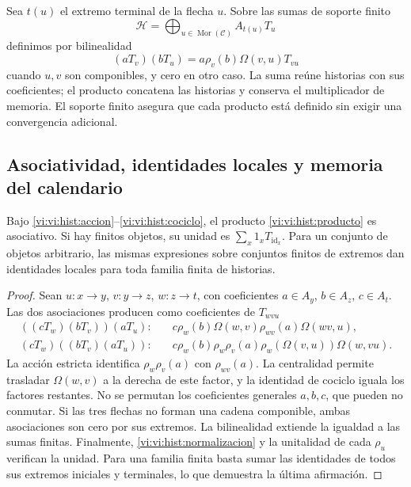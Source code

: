 Sea \(t(u)\) el extremo terminal de la flecha \(u\). Sobre las sumas
de soporte finito
\[
 \mathcal H=\bigoplus_{u\in\operatorname{Mor}(\mathcal C)}A_{t(u)}T_u
\]
definimos por bilinealidad
\begin{equation}
 (aT_v)(bT_u)=
 a\rho_v(b)\Omega(v,u)T_{vu}
 \label{vi:vi:hist:producto}
\end{equation}
cuando \(u,v\) son componibles, y cero en otro caso. La suma reúne
historias con sus coeficientes; el producto concatena las historias y
conserva el multiplicador de memoria. El soporte finito asegura que cada
producto está definido sin exigir una convergencia adicional.

\subsection{Asociatividad, identidades locales y memoria del calendario}
\label{vi:vi:hist:asociatividad}

\begin{proposition}
Bajo \eqref{vi:vi:hist:accion}--\eqref{vi:vi:hist:cociclo}, el producto
\eqref{vi:vi:hist:producto} es asociativo. Si hay finitos objetos, su unidad
es \(\sum_x1_xT_{\operatorname{id}_x}\). Para un conjunto de objetos
arbitrario, las mismas expresiones sobre conjuntos finitos de extremos
dan identidades locales para toda familia finita de historias.
\end{proposition}
\begin{proof}
Sean \(u:x\to y\), \(v:y\to z\), \(w:z\to t\), con coeficientes
\(a\in A_y\), \(b\in A_z\), \(c\in A_t\). Las dos asociaciones
producen como coeficientes de \(T_{wvu}\)
\begin{align*}
 ((cT_w)(bT_v))(aT_u):\quad&
 c\rho_w(b)\Omega(w,v)\rho_{wv}(a)\Omega(wv,u),\\
 (cT_w)((bT_v)(aT_u)):\quad&
 c\rho_w(b)\rho_w\rho_v(a)
 \rho_w(\Omega(v,u))\Omega(w,vu).
\end{align*}
La acción estricta identifica \(\rho_w\rho_v(a)\) con
\(\rho_{wv}(a)\). La centralidad permite trasladar
\(\Omega(w,v)\) a la derecha de este factor, y la identidad de cociclo
iguala los factores restantes. No se permutan los coeficientes generales
\(a,b,c\), que pueden no conmutar. Si las tres flechas no forman una
cadena componible, ambas asociaciones son cero por sus extremos.
La bilinealidad extiende la igualdad a las sumas finitas. Finalmente,
\eqref{vi:vi:hist:normalizacion} y la unitalidad de cada \(\rho_u\)
verifican la unidad. Para una familia finita basta sumar las identidades
de todos sus extremos iniciales y terminales, lo que demuestra la última
afirmación.
\end{proof}

